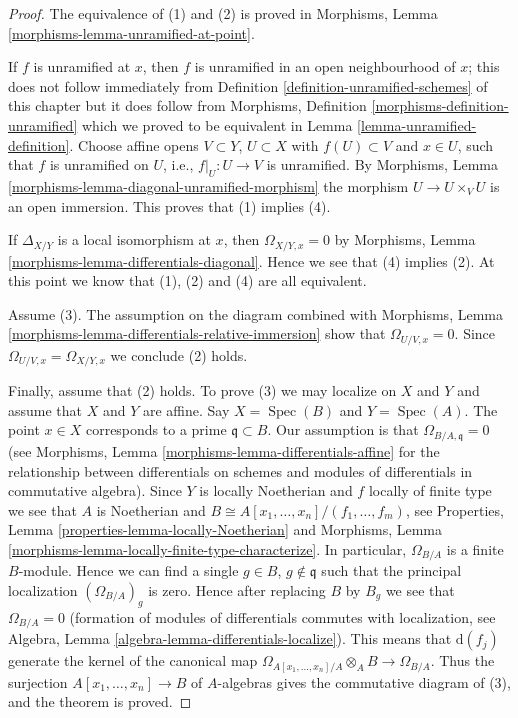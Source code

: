 \documentclass{stacks-project}
\theoremstyle{plain}
\theoremstyle{definition}
\theoremstyle{remark}
\numberwithin{equation}{subsection}
\def\Spec{\mathop{\mathrm{Spec}}}
\begin{document}
\begin{proof}
The equivalence of (1) and (2) is proved in
Morphisms, Lemma \ref{morphisms-lemma-unramified-at-point}.

\medskip\noindent
If $f$ is unramified at $x$, then $f$ is unramified in an open
neighbourhood of $x$; this does not follow immediately
from Definition \ref{definition-unramified-schemes} of this chapter
but it does follow from
Morphisms, Definition \ref{morphisms-definition-unramified} which we
proved to be equivalent in
Lemma \ref{lemma-unramified-definition}.
Choose affine opens $V \subset Y$, $U \subset X$
with $f(U) \subset V$ and $x \in U$, such that $f$ is
unramified on $U$, i.e., $f|_U : U \to V$ is unramified.
By Morphisms, Lemma \ref{morphisms-lemma-diagonal-unramified-morphism}
the morphism $U \to U \times_V U$
is an open immersion. This proves that (1) implies (4).

\medskip\noindent
If $\Delta_{X/Y}$ is a local isomorphism at $x$, then
$\Omega_{X/Y, x} = 0$ by
Morphisms, Lemma \ref{morphisms-lemma-differentials-diagonal}.
Hence we see that (4) implies (2).
At this point we know that (1), (2) and (4) are all equivalent.

\medskip\noindent
Assume (3). The assumption on the diagram combined with
Morphisms, Lemma \ref{morphisms-lemma-differentials-relative-immersion}
show that $\Omega_{U/V, x} = 0$. Since $\Omega_{U/V, x} = \Omega_{X/Y, x}$
we conclude (2) holds.

\medskip\noindent
Finally, assume that (2) holds. To prove (3) we may localize on
$X$ and $Y$ and assume that $X$ and $Y$ are affine.
Say $X = \Spec(B)$ and $Y = \Spec(A)$.
The point $x \in X$ corresponds to a prime $\mathfrak q \subset B$.
Our assumption is that $\Omega_{B/A, \mathfrak q} = 0$
(see Morphisms, Lemma \ref{morphisms-lemma-differentials-affine} for the
relationship between differentials on schemes and modules
of differentials in commutative algebra).
Since $Y$ is locally Noetherian and $f$ locally of finite type
we see that $A$ is Noetherian and
$B \cong A[x_1, \ldots, x_n]/(f_1, \ldots, f_m)$, see
Properties, Lemma \ref{properties-lemma-locally-Noetherian} and
Morphisms, Lemma \ref{morphisms-lemma-locally-finite-type-characterize}.
In particular, $\Omega_{B/A}$ is a finite $B$-module. Hence we
can find a single $g \in B$, $g \not \in \mathfrak q$ such that
the principal localization $(\Omega_{B/A})_g$ is zero. Hence after
replacing $B$ by $B_g$ we see that $\Omega_{B/A} = 0$ (formation
of modules of differentials commutes with localization, see
Algebra, Lemma \ref{algebra-lemma-differentials-localize}). This means that
$\text{d}(f_j)$ generate the kernel of the canonical map
$\Omega_{A[x_1, \ldots, x_n]/A} \otimes_A B \to \Omega_{B/A}$.
Thus the surjection $A[x_1, \ldots, x_n] \to B$ of $A$-algebras gives the
commutative diagram of (3), and the theorem is proved.
\end{proof}
\end{document}
